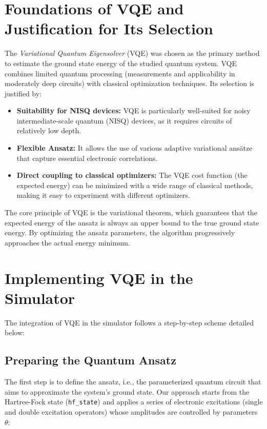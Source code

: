 \section{Foundations of VQE and Justification for Its Selection}

The \textit{Variational Quantum Eigensolver} (VQE) was chosen as the primary method to estimate the ground state energy of the studied quantum system. VQE combines limited quantum processing (measurements and applicability in moderately deep circuits) with classical optimization techniques. Its selection is justified by:

\begin{itemize}
    \item \textbf{Suitability for NISQ devices:} VQE is particularly well-suited for noisy intermediate-scale quantum (NISQ) devices, as it requires circuits of relatively low depth.
    \item \textbf{Flexible Ansatz:} It allows the use of various adaptive variational ansätze that capture essential electronic correlations.
    \item \textbf{Direct coupling to classical optimizers:} The VQE cost function (the expected energy) can be minimized with a wide range of classical methods, making it easy to experiment with different optimizers.
\end{itemize}

The core principle of VQE is the variational theorem, which guarantees that the expected energy of the ansatz is always an upper bound to the true ground state energy. By optimizing the ansatz parameters, the algorithm progressively approaches the actual energy minimum.

\section{Implementing VQE in the Simulator}

The integration of VQE in the simulator follows a step-by-step scheme detailed below:

\subsection{Preparing the Quantum Ansatz}

The first step is to define the ansatz, i.e., the parameterized quantum circuit that aims to approximate the system’s ground state. Our approach starts from the Hartree-Fock state (\texttt{hf\_state}) and applies a series of electronic excitations (single and double excitation operators) whose amplitudes are controlled by parameters \(\theta\):

